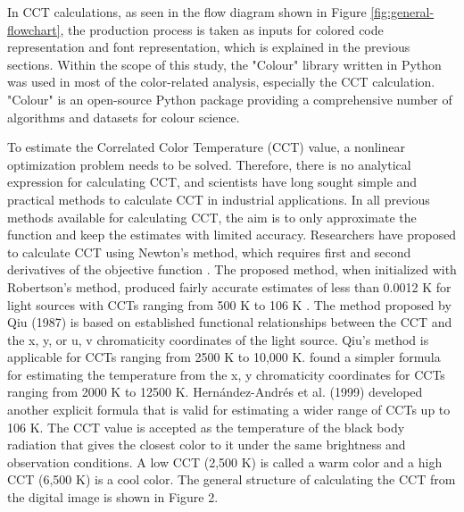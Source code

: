 \documentclass{article}
\begin{document}
In CCT calculations, as seen in the flow diagram shown in Figure  \ref{fig:general-flowchart}, the production process is
taken as inputs for colored code representation and font representation, which is explained in the previous sections.
Within the scope of this study, the "Colour" library \cite{colour2022package} written in Python was used in most of the
color-related analysis, especially the CCT calculation.  "Colour" is an open-source Python package providing a comprehensive number of algorithms and datasets for colour science.

To estimate the Correlated Color Temperature (CCT) value, a nonlinear optimization problem needs to be solved. Therefore, there is no analytical expression for calculating CCT, and scientists have long sought simple and practical methods to calculate CCT in industrial applications. In all previous methods available for calculating CCT, the aim is to only approximate the function and keep the estimates with limited accuracy. Researchers have proposed to calculate CCT using Newton's method, which requires first and second derivatives of the objective function \cite{li2016accurate}. The proposed method, when initialized with Robertson's method, produced fairly accurate estimates of less than 0.0012 K for light sources with CCTs ranging from 500 K to 106 K \cite{robertson1968computation}. The method proposed by Qiu (1987) is based on established functional relationships between the CCT and the x, y, or u, v chromaticity coordinates of the light source. Qiu's method is applicable for CCTs ranging from 2500 K to 10,000 K. \cite{mccamy1992correlated} found a simpler formula for estimating the temperature from the x, y chromaticity coordinates for CCTs ranging from 2000 K to 12500 K. Hernández-Andrés et al. (1999) \cite{hernandez1999calculating} developed another explicit formula that is valid for estimating a wider range of CCTs up to 106 K. The CCT value is accepted as the temperature of the black body radiation that gives the closest color to it under the same brightness and observation conditions. A low CCT (2,500 K) is called a warm color and a high CCT (6,500 K) is a cool color. The general structure of calculating the CCT from the digital image is shown in Figure 2.
\end{document}
